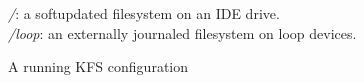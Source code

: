 \begin{figure}[htb]
  \centering
  \caption{A running KFS configuration}{{\it/}: a softupdated
    filesystem on an IDE drive.\\{\it/loop}: an externally journaled
    filesystem on loop devices.}
  \label{fig:kfs-graph}
\end{figure}
